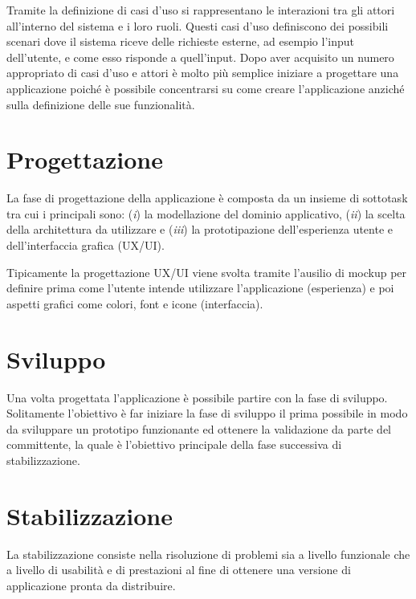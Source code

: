 Tramite la definizione di casi d'uso si rappresentano le interazioni tra gli attori all'interno del sistema e i loro ruoli. Questi casi d'uso definiscono dei possibili scenari dove il sistema riceve delle richieste esterne, ad esempio l'input dell'utente, e come esso risponde a quell'input. Dopo aver acquisito un numero appropriato di casi d'uso e attori è molto più semplice iniziare a progettare una applicazione poiché è possibile concentrarsi su come creare l'applicazione anziché sulla definizione delle sue funzionalità.

\section{Progettazione}
La fase di progettazione della applicazione è composta da un insieme di sottotask tra cui i principali sono: (\textit{i}) la modellazione del dominio applicativo, (\textit{ii}) la scelta della architettura da utilizzare e (\textit{iii}) la prototipazione dell'esperienza utente e dell'interfaccia grafica (UX/UI).

Tipicamente la progettazione UX/UI viene svolta tramite l'ausilio di mockup per definire prima come l'utente intende utilizzare l'applicazione (esperienza) e poi aspetti grafici come colori, font e icone (interfaccia).

\section{Sviluppo}
Una volta progettata l'applicazione è possibile partire con la fase di sviluppo. Solitamente l'obiettivo è far iniziare la fase di sviluppo il prima possibile in modo da sviluppare un prototipo funzionante ed ottenere la validazione da parte del committente, la quale è l'obiettivo principale della fase successiva di stabilizzazione.

\section{Stabilizzazione}
La stabilizzazione consiste nella risoluzione di problemi sia a livello funzionale che a livello di usabilità e di prestazioni al fine di ottenere una versione di applicazione pronta da distribuire. 

